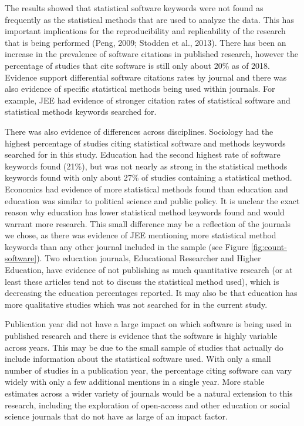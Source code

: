 \documentclass[
  english,
  ,man]{apa7}
\begin{document}
The results showed that statistical software keywords were not found as frequently as the statistical methods that are used to analyze the data. This has important implications for the reproducibility and replicability of the research that is being performed (Peng, 2009; Stodden et al., 2013). There has been an increase in the prevalence of software citations in published research, however the percentage of studies that cite software is still only about 20\% as of 2018. Evidence support differential software citations rates by journal and there was also evidence of specific statistical methods being used within journals. For example, JEE had evidence of stronger citation rates of statistical software and statistical methods keywords searched for.

There was also evidence of differences across disciplines. Sociology had the highest percentage of studies citing statistical software and methods keywords searched for in this study. Education had the second highest rate of software keywords found (21\%), but was not nearly as strong in the statistical methods keywords found with only about 27\% of studies containing a statistical method. Economics had evidence of more statistical methods found than education and education was similar to political science and public policy. It is unclear the exact reason why education has lower statistical method keywords found and would warrant more research. This small difference may be a reflection of the journals we chose, as there was evidence of JEE mentioning more statistical method keywords than any other journal included in the sample (see Figure \ref{fig:count-software}). Two education journals, Educational Researcher and Higher Education, have evidence of not publishing as much quantitative research (or at least these articles tend not to discuss the statistical method used), which is decreasing the education percentages reported. It may also be that education has more qualitative studies which was not searched for in the current study.

Publication year did not have a large impact on which software is being used in published research and there is evidence that the software is highly variable across years. This may be due to the small sample of studies that actually do include information about the statistical software used. With only a small number of studies in a publication year, the percentage citing software can vary widely with only a few additional mentions in a single year. More stable estimates across a wider variety of journals would be a natural extension to this research, including the exploration of open-access and other education or social science journals that do not have as large of an impact factor.
\end{document}
